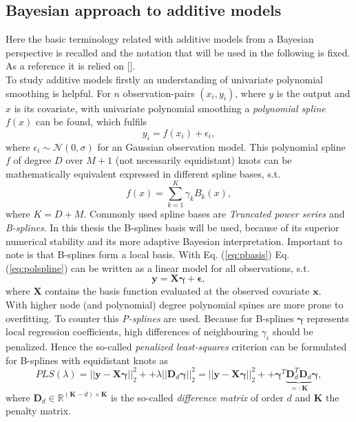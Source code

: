\documentclass[12pt,letterpaper]{article}
\begin{document}
\subsection{Bayesian approach to additive models}
Here the basic terminology related with additive models from a Bayesian perspective is recalled and the notation that will be used in the following is fixed. As a reference it is relied on [\cite{bayessm}]. \\
To study additive models firstly an understanding of univariate polynomial smoothing is helpful. For $n$ observation-pairs $(x_i, y_i)$, where $y$ is the output and $x$ is its covariate, with univariate polynomial smoothing a \textit{polynomial spline} $f(x)$ can be found, which fulfils 
\begin{equation}
y_i = f(x_i) + \epsilon_i,
\label{eq:polspline}
\end{equation}
where $\epsilon_i \sim \mathcal{N}(0,\sigma)$ for an Gaussian observation model. This polynomial spline $f$ of degree $D$ over $M+1$ (not necessarily equidistant) knots can be mathematically equivalent expressed in different spline bases, s.t.  
\begin{equation}
f(x) = \sum^K_{k=1}\gamma_k B_k(x),
\label{eq:pbasis}
\end{equation}
where $K = D + M.$
Commonly used spline bases are \textit{Truncated power series} and \textit{B-splines}. In this thesis the B-splines basis will be used, because of its superior numerical stability and its more adaptive Bayesian interpretation. Important to note is that B-splines form a local basis. With Eq. (\ref{eq:pbasis}) Eq. (\ref{eq:polspline}) can be written as a linear model for all observations, s.t.
\begin{equation}
\mathbf{y} = \mathbf{X} \mathbf{ \gamma } + \mathbf{\epsilon},
\end{equation}
where $\mathbf{X}$ contains the basis function evaluated at the observed covariate $\mathbf{x}$. \\
With higher node (and polynomial) degree polynomial spines are more prone to overfitting. To counter this \textit{P-splines} are used. Because for B-splines $\mathbf{\gamma}$ represents local regression coefficients, high differences of neighbouring $\gamma_i$ should be penalized. Hence the so-called \textit{penalized least-squares} criterion can be formulated for B-splines with equidistant knots as
\begin{equation}
PLS(\lambda) = ||\mathbf{y} - \mathbf{X}\mathbf{\gamma}||^2_2 +
 + \lambda||\mathbf{D}_d\mathbf{\gamma}||^2_2 = ||\mathbf{y} - \mathbf{X}\mathbf{\gamma}||^2_2 +
 + \mathbf{\gamma}^T\underbrace{\mathbf{D}_d^T\mathbf{D}_d}_{=:\mathbf{K}}\mathbf{\gamma},
\end{equation}
where $\mathbf{D}_d \in \mathbb{R}^{(\mathbf{K}-d) \times \mathbf{K}}$ is the so-called \textit{difference matrix} of order $d$ and $\mathbf{K}$ the penalty matrix.
\label{sec:AddMod}
\pagebreak
\end{document}
